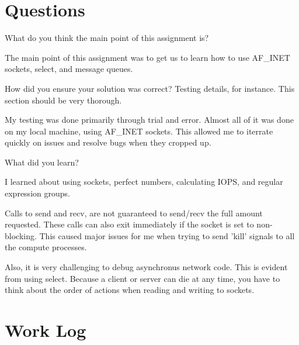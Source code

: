 \documentclass[letterpaper,10pt]{article}
\begin{document}
\section{Questions}
\begin{description}
  \item  What do you think the main point of this assignment is?

         The main point of this assignment was to get us to learn how to
         use AF\_INET sockets, select, and message queues.

  \item  How did you ensure your solution was correct? Testing details, for
         instance. This section should be very thorough.

         My testing was done primarily through trial and error. Almost
         all of it was done on my local machine, using AF\_INET sockets.
         This allowed me to iterrate quickly on issues and resolve bugs
         when they cropped up.

  \item  What did you learn?

         I learned about using sockets, perfect numbers, calculating
         IOPS, and regular expression groups.

         Calls to send and recv, are not guaranteed to send/recv the
         full amount requested. These calls can also exit immediately if
         the socket is set to non-blocking. This caused major issues for
         me when trying to send 'kill' signals to all the compute
         processes.

         Also, it is very challenging to debug asynchronus network code. This
         is evident from using select. Because a client or server can
         die at any time, you have to think about the order of actions
         when reading and writing to sockets.

\end{description}

\newpage

\section{Work Log}


\end{document}
